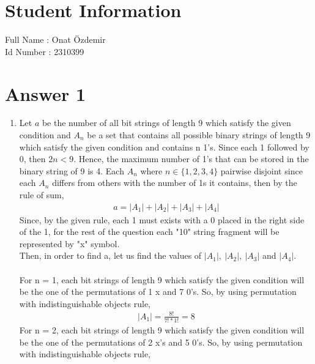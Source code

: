\documentclass[12pt]{article}
\begin{document}
\section*{Student Information } 
Full Name : Onat Özdemir \\
Id Number : 2310399 \\

\section*{Answer 1}
\renewcommand{\theenumi}{\alph{enumi}}
\begin{enumerate}
\item Let $a$ be the number of all bit strings of length 9 which satisfy the given condition and $A_{n}$ be a set that contains all possible binary strings of length 9 which satisfy the given condition and contains n 1's. Since each 1 followed by 0, then $2n < 9$. Hence, the maximum number of 1's that can be stored in the binary string of 9 is 4. Each $A_{n}$ where $n \in \{1,2,3,4\}$ pairwise disjoint since each $A_{n}$ differs from others with the number of 1s it contains, then by the rule of sum,
\begin{equation}
\begin{split}
a = |A_{1}| + |A_{2}| + |A_{3}| + |A_{4}|
\end{split}
\end{equation}
Since, by the given rule, each 1 must  exists with a 0 placed in the right side of the 1, for the rest of the question each "10" string fragment will be represented by "x" symbol.\\
Then, in order to find a, let us find the values of $|A_{1}|,\ |A_{2}|,\ |A_{3}| $ and $|A_{4}|$.\\ \\
For n = 1, each bit strings of length 9 which satisfy the given condition will be the one of the permutations of 1 x and 7 0's. So, by using permutation with indistinguishable objects rule,
\begin{equation}
\begin{split}
|A_{1}| = \frac{8!}{7!*1!} = 8
\end{split}
\end{equation}
For n = 2, each bit strings of length 9 which satisfy the given condition will be the one of the permutations of 2 x's and 5 0's. So, by using permutation with indistinguishable objects rule,

\end{enumerate}
\end{document}
